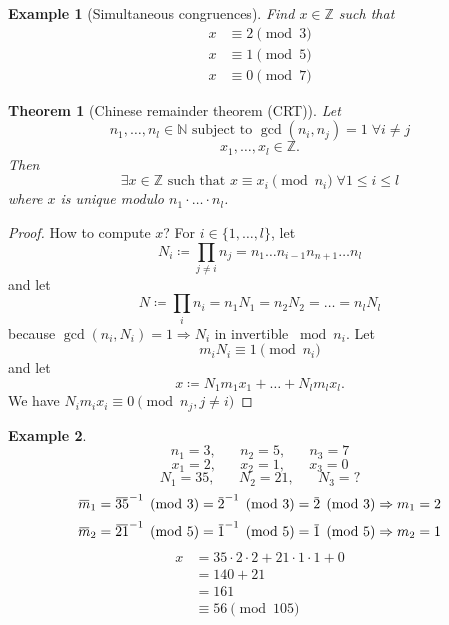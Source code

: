 \documentclass[a4paper]{article}
\newtheorem{ex}{Example}
\newtheorem{theorem}{Theorem}
\newcommand{\N}{\mathbb{N}}
\newcommand{\Z}{\mathbb{Z}}
\newcommand{\overbar}[1]{\mkern 1.5mu\overline{\mkern-1.5mu#1\mkern-1.5mu}\mkern 1.5mu}
\newcommand{\inv}[1]{{#1}^{-1}}
\begin{document}
\begin{ex}[Simultaneous congruences]
Find $x \in \Z$ such that 
\begin{align}
x &\equiv 2 \pmod{3}\\
x &\equiv 1 \pmod{5}\\
x &\equiv 0 \pmod{7}
\end{align}
\end{ex}

\begin{theorem}[Chinese remainder theorem (CRT)] Let
\[ n_1,\dots,n_l \in \N \text{ subject to } \gcd (n_i,n_j) = 1 \;\forall i\neq j \]
\[ x_1, \dots, x_l \in \Z \text{.} \]
Then
\[ \exists x \in \Z \text{ such that } x \equiv x_i \pmod{n_i} \; \forall 1\leq i \leq l \]
where $x$ is unique modulo $n_1 \cdot \dots \cdot n_l$.
\end{theorem}


\begin{proof}
How to compute $x$? For $i \in \{1,\dots,l\}$, let
\[ N_i \coloneq \prod_{j \neq i} n_j = n_1 \dots n_{i-1} n_{n+1} \dots n_l \]
and let
\[ N \coloneq \prod_i n_i = n_1 N_1 = n_2 N_2 = \dots = n_l N_l \]
because $\gcd(n_i,N_i) = 1 \Rightarrow N_i$ in invertible $\bmod n_i$. Let
\[ m_i N_i \equiv 1 \pmod{n_i} \]
and let
\[ x \coloneq N_1 m_1 x_1 + \dots + N_l m_l x_l \text{.} \]
We have $N_i m_i x_i \equiv 0 \pmod{n_j, j\neq i}$%
\end{proof}

\begin{ex}
  \[
    n_1 = 3, \hspace{20pt} n_2 = 5, \hspace{20pt} n_3 = 7
  \] \[
    x_1 = 2, \hspace{20pt} x_2 = 1, \hspace{20pt} x_3 = 0
  \] \[
    N_1 = 35, \hspace{20pt} N_2 = 21, \hspace{20pt} N_3 = ?
  \]
  \[ \overbar{m}_1 = \inv{\overbar{35}} \pmod{3} = \inv{\overbar{2}} \pmod{3} = \overbar{2} \pmod{3} \Rightarrow m_1 = 2 \]
  \[ \overbar{m}_2 = \inv{\overbar{21}} \pmod{5} = \inv{\overbar{1}} \pmod{5} = \overbar{1} \pmod{5} \Rightarrow m_2 = 1 \]
  \begin{align*}
    x &= 35 \cdot 2 \cdot 2 + 21 \cdot 1 \cdot 1 + 0 \\
      &= 140 + 21 \\
      &= 161 \\
      &\equiv 56 \pmod{105}
  \end{align*}
\end{ex}
\end{document}
